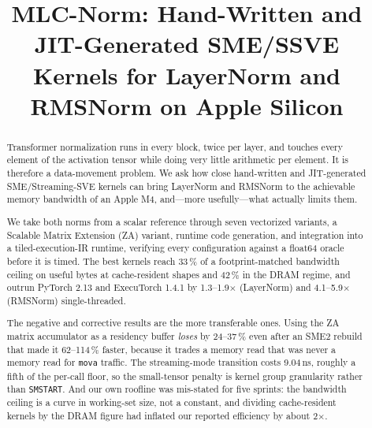 \documentclass[conference,10pt]{IEEEtran}
\newcommand{\code}[1]{\texttt{\small #1}}
\begin{document}
\title{MLC-Norm: Hand-Written and JIT-Generated SME/SSVE\\
       Kernels for LayerNorm and RMSNorm on Apple Silicon}

\author{%
}

\maketitle

\begin{abstract}
Transformer normalization runs in every block, twice per layer, and touches
every element of the activation tensor while doing very little arithmetic per
element. It is therefore a data-movement problem. We ask how close hand-written
and JIT-generated SME/Streaming-SVE kernels can bring LayerNorm and RMSNorm to
the achievable memory bandwidth of an Apple M4, and---more usefully---what
actually limits them.

We take both norms from a scalar reference through seven vectorized variants, a
Scalable Matrix Extension (ZA) variant, runtime code generation, and integration
into a tiled-execution-IR runtime, verifying every configuration against a
float64 oracle before it is timed. The best kernels reach 33\,\% of a
footprint-matched bandwidth ceiling on useful bytes at cache-resident shapes and
42\,\% in the DRAM regime, and outrun PyTorch 2.13 and ExecuTorch 1.4.1 by
1.3--1.9$\times$ (LayerNorm) and 4.1--5.9$\times$ (RMSNorm) single-threaded.

The negative and corrective results are the more transferable ones. Using the
ZA matrix accumulator as a residency buffer \emph{loses} by 24--37\,\% even
after an SME2 rebuild that made it 62--114\,\% faster, because it trades a
memory read that was never a memory read for \code{mova} traffic. The
streaming-mode transition costs 9.04\,ns, roughly a fifth of the per-call floor,
so the small-tensor penalty is kernel group granularity rather than
\code{SMSTART}. And our own roofline was mis-stated for five sprints: the
bandwidth ceiling is a curve in working-set size, not a constant, and dividing
cache-resident kernels by the DRAM figure had inflated our reported efficiency
by about 2$\times$.
\end{abstract}
\end{document}

